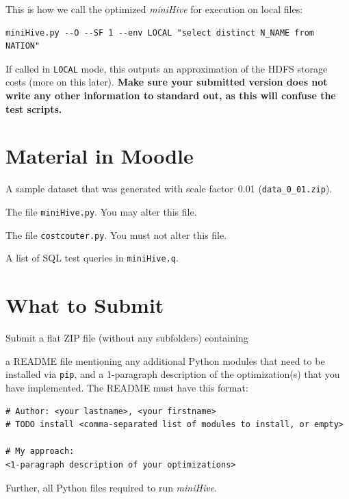 \documentclass[12pt]{exam}
\begin{document}
\noindent
This is how we  call the optimized {\em miniHive}\/ for execution on local files:

\begin{Verbatim}[frame=single]
miniHive.py --O --SF 1 --env LOCAL "select distinct N_NAME from NATION"
\end{Verbatim}

If called in \verb!LOCAL! mode, this outputs an approximation of the HDFS storage costs (more on this later).
{\bf Make sure your submitted version does not write any other information to standard out, as this will confuse the test scripts.}

\section{Material in Moodle}

\begin{compactitem}

\item    
A sample dataset that was generated with scale factor~0.01 (\verb!data_0_01.zip!). 


\item 
The  file \verb!miniHive.py!. You may alter this file.

\item 
The file \verb!costcouter.py!. You must not alter this file.

\item
A list of SQL test queries in \verb!miniHive.q!.

\end{compactitem}



\section{What to Submit}

Submit a flat ZIP file (without any subfolders) containing

\begin{compactitem}
    \item a README file mentioning any additional Python modules that need to be installed via \verb!pip!, and a 1-paragraph description of the optimization(s) that you have implemented. The README must have this format:

    \begin{Verbatim}[frame=single,fontsize=\small]
# Author: <your lastname>, <your firstname>
# TODO install <comma-separated list of modules to install, or empty>
        
# My approach:
<1-paragraph description of your optimizations>
    \end{Verbatim}
    
    
    \item Further, all Python files required to run {\em miniHive}. 

\end{compactitem}
\end{document}
